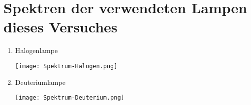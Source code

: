 
\newpage
\section{Spektren der verwendeten Lampen dieses Versuches}
\label{sec:spekternLampen}

\begin{enumerate}
	\item Halogenlampe
	\begin{center}
		\captionsetup{type=figure}
		\texttt{[image: Spektrum-Halogen.png]}
		\label{fig:halogen}
	\end{center}
	\item Deuteriumlampe
	\begin{center}
		\captionsetup{type=figure}
		\texttt{[image: Spektrum-Deuterium.png]}
		\label{fig:deuterium}
	\end{center}
\end{enumerate}
